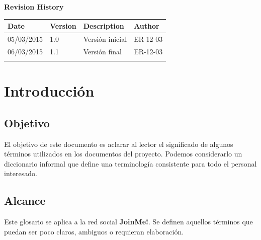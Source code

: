 \documentclass[12pt, a4paper, titlepage]{article}
\begin{document}
\begin{titlepage}
\vspace{2cm}
\begin{center}
	\large{\textbf{Revision History}}
	
    \begin{tabular}{ | p{4cm} | p{2cm} | p{5cm} | p{4cm} |}
    \hline
    \textbf{Date} & \textbf{Version} & \textbf{Description} & \textbf{Author} \\ \hline
    05/03/2015 & 1.0 & Versión inicial & ER-12-03  \\ \hline
    06/03/2015&  1.1 & Versión final & ER-12-03 \\ \hline
    & & & \\ \hline
    \end{tabular}
\end{center}

\end{titlepage}
\clearpage


\tableofcontents
\clearpage

\section{Introducción}

\subsection{Objetivo}

El objetivo de este documento es aclarar al lector el significado de algunos términos utilizados en los documentos del proyecto. Podemos considerarlo un diccionario informal que define una terminología consistente para todo el personal interesado.

\subsection{Alcance}

Este glosario se aplica a la red social \textbf{JoinMe!}. Se definen aquellos términos que puedan ser poco claros, ambiguos o requieran elaboración.
\end{document}
